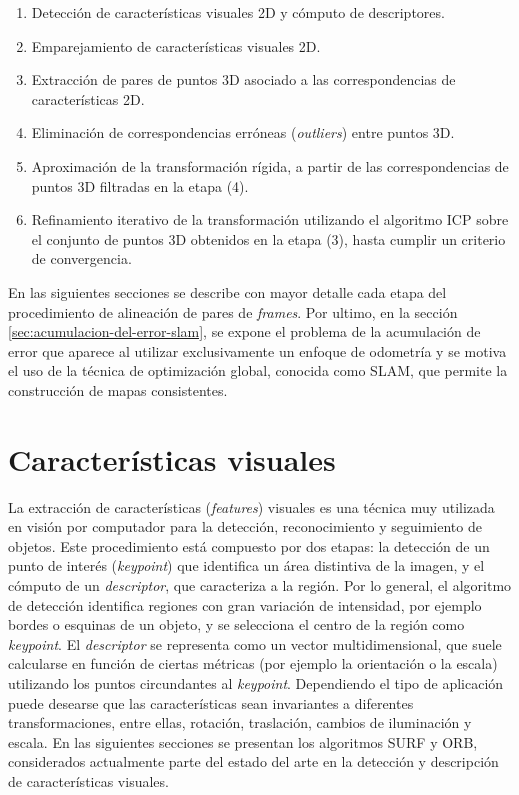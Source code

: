 \begin{enumerate}
\item Detección de características visuales 2D y cómputo de descriptores.

\item Emparejamiento de características visuales 2D.

\item Extracción de pares de puntos 3D asociado a las correspondencias de características 2D.

\item Eliminación de correspondencias erróneas (\textit{outliers}) entre puntos 3D.

\item Aproximación de la transformación rígida, a partir de las correspondencias de puntos 3D filtradas en la etapa (4).

\item Refinamiento iterativo de la transformación utilizando el algoritmo ICP sobre el conjunto de puntos 3D obtenidos en la etapa (3), hasta cumplir un criterio de convergencia.
\end{enumerate}

En las siguientes secciones se describe con mayor detalle cada etapa del procedimiento de alineación de pares de \textit{frames}. Por ultimo, en la sección \ref{sec:acumulacion-del-error-slam}, se expone el problema de la acumulación de error que aparece al utilizar exclusivamente un enfoque de odometría y se motiva el uso de la técnica de optimización global, conocida como SLAM, que permite la construcción de mapas consistentes.

\section{Características visuales}
\label{sec:features}

La extracción de características (\textit{features}) visuales es una técnica muy utilizada en visión por computador para la detección, reconocimiento y seguimiento de objetos. Este procedimiento está compuesto por dos etapas: la detección de un punto de interés (\textit{keypoint}) que identifica un área distintiva de la imagen, y el cómputo de un \textit{descriptor}, que caracteriza a la región. Por lo general, el algoritmo de detección identifica regiones con gran variación de intensidad, por ejemplo bordes o esquinas de un objeto, y se selecciona el centro de la región como \textit{keypoint}. El \textit{descriptor} se representa como un vector multidimensional, que suele calcularse en función de ciertas métricas (por ejemplo la orientación o la escala) utilizando los puntos circundantes al \textit{keypoint}. Dependiendo el tipo de aplicación puede desearse que las características sean invariantes a diferentes transformaciones, entre ellas, rotación, traslación, cambios de iluminación y escala. En las siguientes secciones se presentan los algoritmos SURF y ORB, considerados actualmente parte del estado del arte en la detección y descripción de características visuales.

